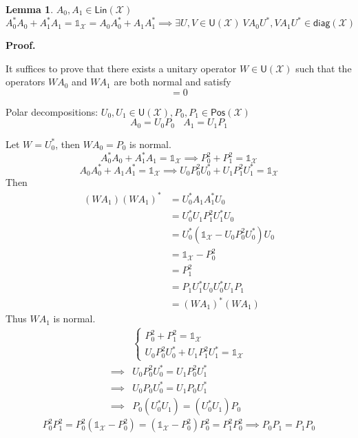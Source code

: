 \documentclass[aps,pra,onecolumn,notitlepage,superscriptaddress]{revtex4-1}
\newcommand{\spc}[1]{\mathcal{#1}}
\newcommand{\Lin}{\mathsf{Lin}}
\newcommand{\Pos}{\mathsf{Pos}}
\newcommand{\U}{\mathsf{U}}
\newcommand{\diag}{\mathsf{diag}}
\newcommand\I{\mathds{1}}
\newtheorem{lemma}{Lemma}
\def\Proof{{\bf Proof.~}}
\begin{document}
    \begin{lemma}
        $A_0, A_1 \in \Lin(\spc X)$
        \begin{equation}
            A_0^*A_0 + A_1^*A_1 = \I_{\spc X} = A_0A_0^* + A_1A_1^* \implies \exists U,V \in \U(\spc X) \ VA_0U^*, VA_1U^* \in \diag(\spc X)
        \end{equation}
    \end{lemma}
    \Proof {
        It suffices to prove that there exists a unitary operator $W \in \U(\spc X)$ such that the operators $WA_0$ and $WA_1$ are both normal and satisfy
        \begin{equation}
            [WA_0, WA_1] = 0
        \end{equation}

        Polar decompositions: $U_0,U_1 \in \U(\spc X), P_0,P_1 \in \Pos(\spc X)$
        \begin{equation}
            A_0 = U_0P_0 \ \ \ \ A_1 = U_1P_1
        \end{equation}

        Let $W = U_0^*$, then $WA_0 = P_0$ is normal.
        \begin{equation}
            A_0^*A_0 + A_1^*A_1 = \I_{\spc X} \implies P_0^2 + P_1^2 = \I_{\spc X}
        \end{equation}
        \begin{equation}
            A_0A_0^* + A_1A_1^* = \I_{\spc X} \implies U_0P_0^2U_0^* + U_1P_1^2U_1^* = \I_{\spc X}
        \end{equation}
        Then
        \begin{align*}
            (WA_1)(WA_1)^* 
            &= U_0^*A_1A_1^*U_0 \\
            &= U_0^*U_1P_1^2U_1^*U_0 \\
            &= U_0^*(\I_{\spc X} - U_0P_0^2U_0^*)U_0 \\
            &= \I_{\spc X} - P_0^2 \\
            &= P_1^2 \\
            &= P_1U_1^*U_0U_0^*U_1P_1 \\
            &= (WA_1)^*(WA_1)
        \end{align*}
        Thus $WA_1$ is normal.
        \begin{align*}
            &\begin{cases}
                P_0^2 + P_1^2 = \I_{\spc X} \\
                U_0P_0^2U_0^* + U_1P_1^2U_1^* = \I_{\spc X}
            \end{cases} \\
            \implies& U_0P_0^2U_0^* = U_1P_0^2U_1^* \\
            \implies& U_0P_0U_0^* = U_1P_0U_1^* \\
            \implies& P_0(U_0^*U_1) = (U_0^*U_1)P_0
        \end{align*}
        \begin{equation}
            P_0^2P_1^2 = P_0^2(\I_{\spc X}-P_0^2) = (\I_{\spc X}-P_0^2)P_0^2 = P_1^2P_0^2 \implies P_0P_1 = P_1P_0
        \end{equation}

}
\end{document}
